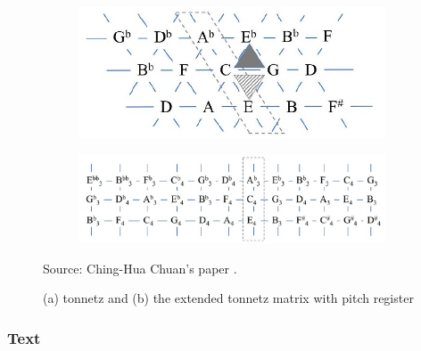 \documentclass[12pt]{report}
\begin{document}
\begin{figure}[h]
    \centering
    \newlength{\MyOtherHeightThree}
    \begin{subfigure}[t]{0.38\textwidth}
        \centering
        \includegraphics[width=\textwidth]{images/music/pianoroll/tonnetz.jpg}
        \caption{}
        \label{fig:tonnetz}
    \end{subfigure}
    \hfill
    \begin{subfigure}[t]{0.6\textwidth}
        \centering
        \includegraphics[width=\textwidth]{images/music/pianoroll/tonnetz_extended.jpg}
        \caption{}
        \label{fig:tonnetz_extended}
    \end{subfigure}
    \caption{(a) tonnetz and (b) the extended tonnetz matrix with pitch register}
    Source: Ching-Hua Chuan's paper \cite{chuan_modeling_nodate}.
    \label{fig:tonnetz_representation}
\end{figure}

\subsubsection{Text}
\label{sec:rw:midi:text}
\end{document}

